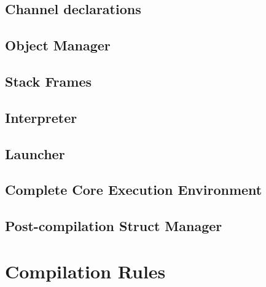 \documentclass[a4paper,11pt]{report}
\begin{document}
\begin{refsection}
\section{Channel declarations}
\label{cee-model-channels}





\section{Object Manager}
\label{object-manager-appendix}


\section{Stack Frames}


\section{Interpreter}
\label{interpreter-appendix}





\section{Launcher}
\label{launcher-appendix}


\section{Complete Core Execution Environment}


\section{Post-compilation Struct Manager}
\label{struct-manager-appendix}


\chapter{Compilation Rules}
\label{compilation-rules-appendix}




\end{refsection}
\end{document}
